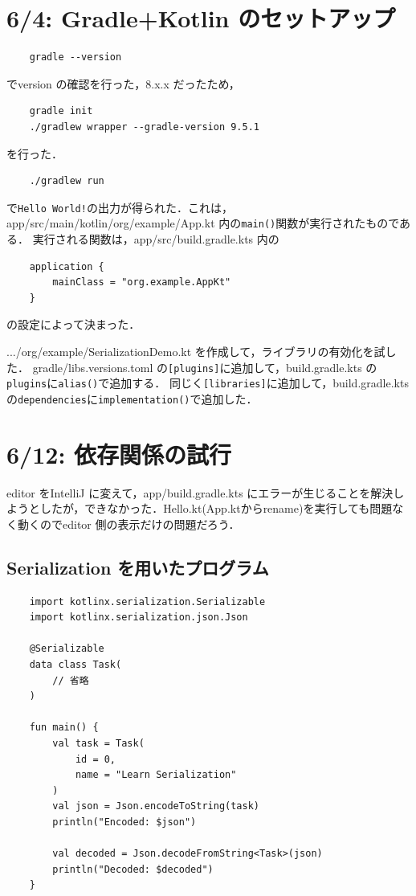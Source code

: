 \documentclass{ltjsarticle}
\begin{document}
\section{6/4: Gradle+Kotlin のセットアップ}
\begin{verbatim}
    gradle --version
\end{verbatim}
でversion の確認を行った，8.x.x だったため，
\begin{verbatim}
    gradle init
    ./gradlew wrapper --gradle-version 9.5.1   
\end{verbatim}
を行った．
\begin{verbatim}
    ./gradlew run    
\end{verbatim}
で\texttt{Hello World!}の出力が得られた．これは，app/src/main/kotlin/org/example/App.kt 内の\texttt{main()}関数が実行されたものである．
実行される関数は，app/src/build.gradle.kts 内の
\begin{verbatim}
    application {
        mainClass = "org.example.AppKt"
    }    
\end{verbatim}
の設定によって決まった．

.../org/example/SerializationDemo.kt を作成して，ライブラリの有効化を試した．
gradle/libs.versions.toml の\texttt{[plugins]}に追加して，build.gradle.kts の\texttt{plugins}に\texttt{alias()}で追加する．
同じく\texttt{[libraries]}に追加して，build.gradle.kts の\texttt{dependencies}に\texttt{implementation()}で追加した．


\section{6/12: 依存関係の試行}
editor をIntelliJ に変えて，app/build.gradle.kts にエラーが生じることを解決しようとしたが，できなかった．Hello.kt(App.ktからrename)を実行しても問題なく動くのでeditor 側の表示だけの問題だろう．

\subsection{Serialization を用いたプログラム}
\begin{verbatim}
    import kotlinx.serialization.Serializable
    import kotlinx.serialization.json.Json

    @Serializable
    data class Task(
        // 省略
    )

    fun main() {
        val task = Task(
            id = 0,
            name = "Learn Serialization"
        )
        val json = Json.encodeToString(task)
        println("Encoded: $json")

        val decoded = Json.decodeFromString<Task>(json)
        println("Decoded: $decoded")
    }
\end{verbatim}
\end{document}
